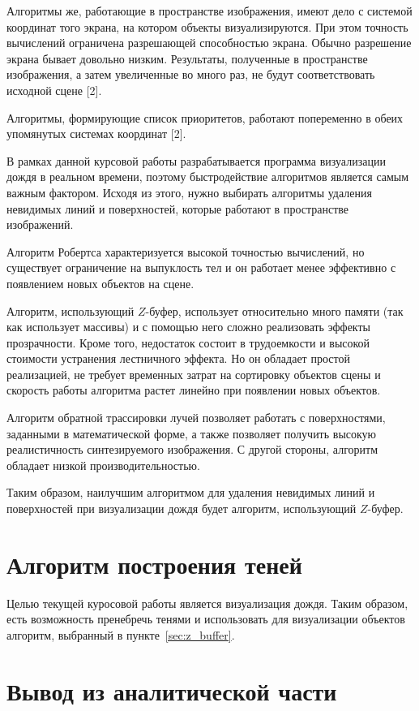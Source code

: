 Алгоритмы же, работающие в пространстве изображения, имеют дело с системой координат того экрана, на котором объекты визуализируются. 
При этом точность вычислений ограничена разрешающей способностью экрана. Обычно разрешение экрана бывает довольно низким. 
Результаты, полученные в пространстве изображения, а затем увеличенные во много раз, не будут соответствовать исходной сцене [2].

Алгоритмы, формирующие список приоритетов, работают попеременно в обеих упомянутых системах координат [2].

В рамках данной курсовой работы разрабатывается программа визуализации дождя в реальном времени, поэтому быстродействие алгоритмов является самым важным фактором. Исходя из этого, нужно выбирать алгоритмы удаления невидимых линий и поверхностей, которые работают в пространстве изображений.

Алгоритм Робертса характеризуется высокой точностью вычислений, но существует ограничение на выпуклость тел и он работает менее эффективно с появлением новых объектов на сцене.

Алгоритм, использующий $Z$-буфер, использует относительно много памяти (так как использует массивы) и с помощью него сложно реализовать эффекты прозрачности. 
Кроме того, недостаток состоит в трудоемкости и высокой стоимости устранения лестничного эффекта. 
Но он обладает простой реализацией, не требует временных затрат на сортировку объектов сцены и скорость работы алгоритма растет линейно при появлении новых объектов.

Алгоритм обратной трассировки лучей позволяет работать с поверхностями, заданными в математической форме, а также позволяет получить высокую реалистичность синтезируемого изображения. 
С другой стороны, алгоритм обладает низкой производительностью.

Таким образом, наилучшим алгоритмом для удаления невидимых линий и поверхностей при визуализации дождя будет алгоритм, использующий $Z$-буфер.

\section{Алгоритм построения теней}

Целью текущей куросовой работы является визуализация дождя. Таким образом, есть возможность пренебречь тенями и использовать для визуализации объектов алгоритм, выбранный в пункте~\ref{sec:z_buffer}.

\section*{Вывод из аналитической части}

